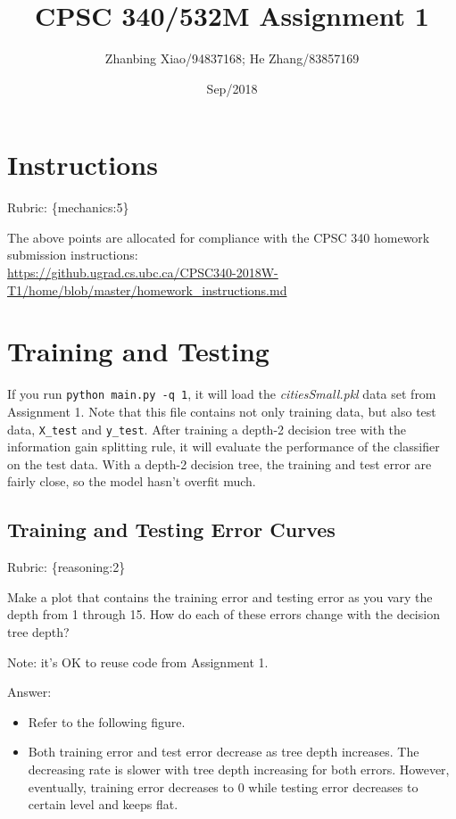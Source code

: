 \documentclass{article}
\def\rubric#1{\gre{Rubric: \{#1\}}}{}
\def\blu#1{{\color{blu}#1}}
\def\gre#1{{\color{gre}#1}}
\begin{document}
\title{CPSC 340/532M Assignment 1}
\author{Zhanbing Xiao/94837168; He Zhang/83857169}
\date{Sep/2018}
\maketitle
\maketitle
\vspace{-4em}

\section*{Instructions}
\rubric{mechanics:5}

The above points are allocated for compliance with the CPSC 340 homework submission instructions:\\
\url{https://github.ugrad.cs.ubc.ca/CPSC340-2018W-T1/home/blob/master/homework_instructions.md}



\section{Training and Testing}
If you run \texttt{python main.py \string-q 1}, it will load the \emph{citiesSmall.pkl} data set from Assignment 1.
Note that this file contains not only training data, but also test data, \texttt{X\string_test} and \texttt{y\string_test}.
After training a depth-2 decision tree with the information gain splitting rule, it will evaluate the performance of the classifier on the test data.
With a depth-2 decision tree, the training and test error are fairly close, so the model hasn't overfit much.

\subsection{Training and Testing Error Curves}
\rubric{reasoning:2}

\blu{Make a plot that contains the training error and testing error as you vary the depth from 1 through 15. How do each of these errors change with the decision tree depth?}

Note: it's OK to reuse code from Assignment 1.

\gre{
Answer:
\begin{itemize}
\item Refer to the following figure.
\item Both training error and test error decrease as tree depth increases. The decreasing rate is slower with tree depth increasing for both errors. However, eventually, training error decreases to 0 while testing error decreases to certain level and keeps flat.
\end{itemize}
}
\end{document}
